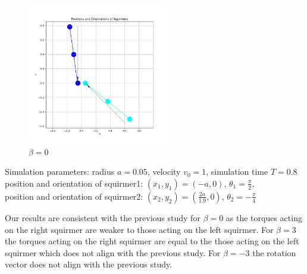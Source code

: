 \documentclass{article}
\begin{document}
\begin{figure}[H]
\begin{minipage}{0.49\textwidth}
        \caption{\footnotesize $\beta = 3$}
    \end{minipage}
    \includegraphics[width=0.55\textwidth]{graphs/simulations/sim_sq_sq/beta0/mpi_4_.png}
    \caption{\footnotesize $\beta = 0$}
\end{figure}
\begin{center}
    Simulation parameters: radius $a=0.05$, velocity $v_0=1$, simulation time $T=0.8$\\
        position and orientation of squirmer1: $(x_1,y_1)=(-a,0)$, $\theta_1=\frac{\pi}{2}$,\\
        position and orientation of squirmer2: $(x_2,y_2)=(\frac{2a}{1.9},0)$, $\theta_2=-\frac{\pi}{4}$
\end{center}
Our results are consistent with the previous study\cite{Stark} for $\beta = 0$ as the torques acting on the right 
squirmer are weaker to those acting on the left squirmer. For $\beta = 3$ the torques acting on the right squirmer are
equal to the those acting on the left squirmer which does not align with the previous study.
For $\beta = -3$ the rotation vector does not align with the previous study.
\\
\\
\end{document}
